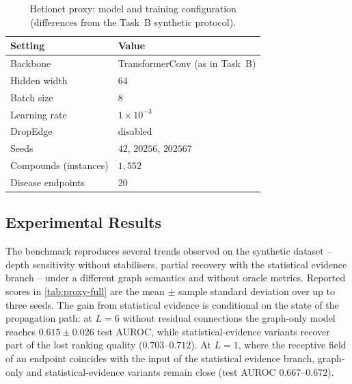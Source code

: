 \begin{table}[H]
  \centering
  \small
  \caption{Hetionet proxy: model and training configuration
    (differences from the Task~B synthetic protocol).}
  \label{tab:hetionet-config}
  \begin{tabular}{ll}
    \toprule
    Setting & Value \\
    \midrule
    Backbone & TransformerConv (as in Task~B) \\
    Hidden width & 64 \\
    Batch size & 8 \\
    Learning rate & $1\times10^{-3}$ \\
    DropEdge & disabled \\
    Seeds & $42$, $20256$, $202567$ \\
    Compounds (instances) & $1{,}552$ \\
    Disease endpoints & 20 \\
    \bottomrule
  \end{tabular}
\end{table}

\subsection{Experimental Results}
\label{sec:hetionet-results}


The benchmark reproduces several trends
observed on the synthetic dataset -- depth sensitivity without stabilisers,
partial recovery with the statistical evidence branch -- under a different graph semantics 
and without
oracle metrics.
Reported scores in \cref{tab:proxy-full} are the mean $\pm$ sample standard deviation
over up to three seeds.
The gain from statistical evidence is conditional on the state of the
propagation path: at $L=6$ without residual connections the graph-only model
reaches $0.615 \pm 0.026$ test AUROC, while statistical-evidence variants recover
part of the lost ranking quality ($0.703$--$0.712$).
At $L=1$, where the receptive field of an endpoint coincides with the input of
the statistical evidence branch, graph-only and statistical-evidence variants remain close
(test AUROC $0.667$--$0.672$).

